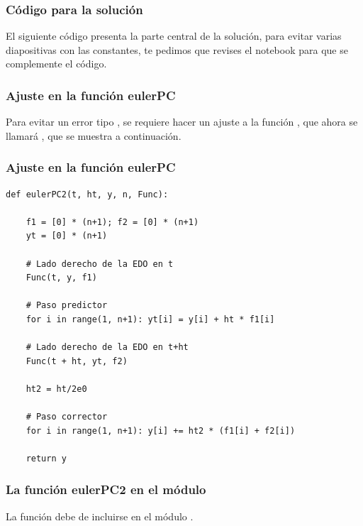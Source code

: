 \documentclass[12pt]{beamer}
\begin{document}
\begin{frame}
\frametitle{Código para la solución}
El siguiente código presenta la parte central de la solución, para evitar varias diapositivas con las constantes, te pedimos que revises el notebook para que se complemente el código.
\end{frame}
\begin{frame}
\frametitle{Ajuste en la función eulerPC}
Para evitar un error tipo , se requiere hacer un ajuste a la función , que ahora se llamará , que se muestra a continuación.
\end{frame}
\begin{frame}
\frametitle{Ajuste en la función eulerPC}
\begin{lstlisting}[caption=Ajuste en el tamaño de las listas]
def eulerPC2(t, ht, y, n, Func):

    f1 = [0] * (n+1); f2 = [0] * (n+1)
    yt = [0] * (n+1)
 
    # Lado derecho de la EDO en t
    Func(t, y, f1)

    # Paso predictor
    for i in range(1, n+1): yt[i] = y[i] + ht * f1[i]
    
    # Lado derecho de la EDO en t+ht
    Func(t + ht, yt, f2)
 
    ht2 = ht/2e0

    # Paso corrector
    for i in range(1, n+1): y[i] += ht2 * (f1[i] + f2[i])
    
    return y
\end{lstlisting}
\end{frame}
\begin{frame}
\frametitle{La función eulerPC2 en el módulo}
La función  debe de incluirse en el módulo .
\end{frame}
\end{document}
